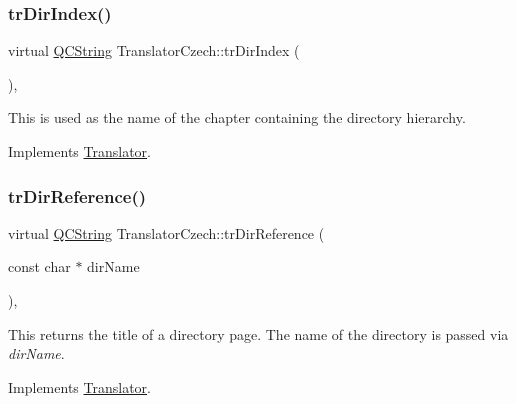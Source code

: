 \mbox{\label{class_translator_czech_ab1ba980534dfebb0e523a7a36f0a5489}} 
\subsubsection{\texorpdfstring{trDirIndex()}{trDirIndex()}}
{\footnotesize\ttfamily virtual \mbox{\hyperlink{class_q_c_string}{Q\+C\+String}} Translator\+Czech\+::tr\+Dir\+Index (\begin{DoxyParamCaption}{ }\end{DoxyParamCaption})\hspace{0.3cm}{\ttfamily [inline]}, {\ttfamily [virtual]}}

This is used as the name of the chapter containing the directory hierarchy. 

Implements \mbox{\hyperlink{class_translator}{Translator}}.

\mbox{\label{class_translator_czech_a749cbb6588827df5eaf78e857142d6b3}} 
\subsubsection{\texorpdfstring{trDirReference()}{trDirReference()}}
{\footnotesize\ttfamily virtual \mbox{\hyperlink{class_q_c_string}{Q\+C\+String}} Translator\+Czech\+::tr\+Dir\+Reference (\begin{DoxyParamCaption}\item[{const char $\ast$}]{dir\+Name }\end{DoxyParamCaption})\hspace{0.3cm}{\ttfamily [inline]}, {\ttfamily [virtual]}}

This returns the title of a directory page. The name of the directory is passed via {\itshape dir\+Name}. 

Implements \mbox{\hyperlink{class_translator}{Translator}}.

\mbox{\label{class_translator_czech_aec923d474d603728e43f9d24b3cef66b}} 
